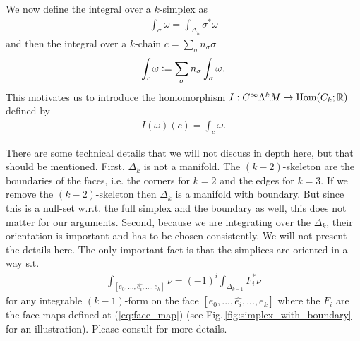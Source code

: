 \documentclass[../master_thesis.tex]{subfiles}
\begin{document}
We now define the integral over a $k$-simplex as
\begin{align*}
    \int_\sigma \omega = \int_{\Delta_k} \sigma^* \omega
\end{align*}
and then the integral over a $k$-chain 
$c = \sum_\sigma n_\sigma \sigma$
\begin{align*}
    \int_c \omega \vcentcolon= \sum \limits_\sigma n_\sigma \int_\sigma \omega.
\end{align*}
This motivates us to introduce the homomorphism $I: C^\infty \Lambda^k M 
\rightarrow \text{Hom}(C_k;\mathbb{R})$ defined by 
\begin{align*}
    I(\omega)(c) = \int_c \omega.
\end{align*}
\begin{remark}
    There are some technical details that we will not discuss in depth here,
    but that should be mentioned. First, $\Delta_k$ is not a manifold. 
    The $(k-2)$-skeleton are the boundaries of the faces, i.e. the corners for $k=2$ and the 
    edges for $k=3$. If we remove the $(k-2)$-skeleton 
    then $\Delta_k$ is a manifold 
    with boundary. But since this is a null-set w.r.t. the full simplex and 
    the boundary as well, this does not matter for our arguments. 
    Second, because we are integrating over the $\Delta_k$, their orientation is 
    important and has to be chosen consistently. We will not present the details here. The 
    only important fact is that the simplices are oriented in a way s.t.
    \begin{align}
        \int_{[e_0,...,\widehat{e_i}, ..., e_k]} \nu = (-1)^i \int_{\Delta_{k-1}} F_i^* \nu 
        \label{eq:integral_boundary_face}
    \end{align}
    for any integrable $(k-1)$-form on the face $[e_0,...,\widehat{e_i}, ..., e_k]$
    where the $F_i$ are the face maps defined at (\ref{eq:face_map})
    (see Fig.\,\ref{fig:simplex_with_boundary} for an illustration).
    Please consult \cite[Sec. V.5]{arnold} for more 
    details.
\end{remark}
\end{document}
